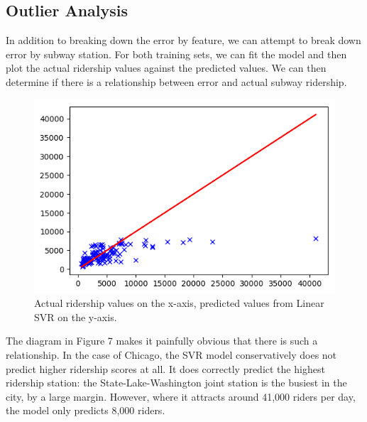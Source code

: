 \documentclass{article}
\begin{document}
\subsection{Outlier Analysis}

In addition to breaking down the error by feature, we can attempt to break down error by subway station. For both training sets, we can fit the model and then plot the actual ridership values against the predicted values. We can then determine if there is a relationship between error and actual subway ridership. 

\begin{figure}[H]\label{fig:f7}
\begin{center}\includegraphics[scale=1]{actual_vs_predicted_chi}\end{center}
\caption{Actual ridership values on the x-axis, predicted values from Linear SVR on the y-axis.}
\end{figure}

The diagram in Figure 7 makes it painfully obvious that there is such a relationship. In the case of Chicago, the SVR model conservatively does not predict higher ridership scores at all. It does correctly predict the highest ridership station: the State-Lake-Washington joint station is the busiest in the city, by a large margin. However, where it attracts around 41,000 riders per day, the model only predicts 8,000 riders. 
\end{document}
